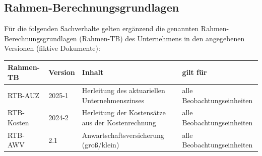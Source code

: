 \subsection{Rahmen-Berechnungsgrundlagen}\label{sec:rahmentb}

Für die folgenden Sachverhalte gelten ergänzend die genannten
Rahmen-Berechnungsgrundlagen (Rahmen-TB) des Unternehmens in den
angegebenen Versionen (fiktive Dokumente):

\begin{center}\small
\begin{tabular}{@{}llll@{}}
\toprule
Rahmen-TB & Version & Inhalt & gilt für \\
\midrule
RTB-AUZ & 2025-1 & Herleitung des aktuariellen Unternehmenszinses & alle Beobachtungseinheiten \\
RTB-Kosten & 2024-2 & Herleitung der Kostensätze aus der Kostenrechnung & alle Beobachtungseinheiten \\
RTB-AWV & 2.1 & Anwartschaftsversicherung (groß/klein) & alle Beobachtungseinheiten \\
\bottomrule
\end{tabular}
\end{center}
